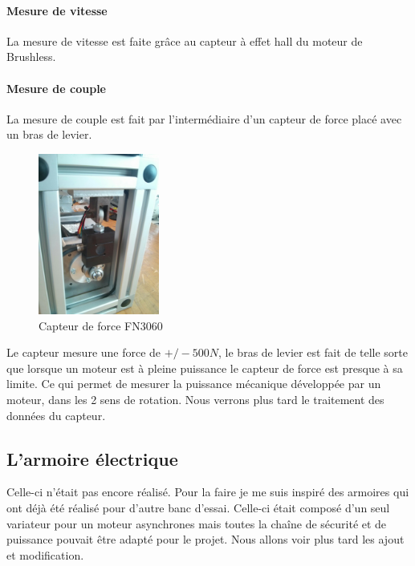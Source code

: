 \documentclass[11pt]{article}
\begin{document}
\paragraph{Mesure de vitesse \\}

La mesure de vitesse est faite grâce au capteur à effet hall du moteur de Brushless.

\paragraph{Mesure de couple \\}
La mesure de couple est fait par l'intermédiaire d'un capteur de force placé avec un bras de levier.\\

\begin{figure}[!h]
    \centering
    \includegraphics[width=150px]{IMG_20160628_183033.jpg}
    \caption{Capteur de force FN3060}
\end{figure}
\newpage

Le capteur mesure une force de $+/- 500 N$, le bras de levier est fait de telle sorte que lorsque un moteur est à pleine puissance le capteur de force est presque à sa limite. Ce qui permet de mesurer la puissance mécanique développée par un moteur, dans les 2 sens de rotation. Nous verrons plus tard le traitement des données du capteur.

\subsection{L'armoire électrique}

Celle-ci n'était pas encore réalisé. Pour la faire je me suis inspiré des armoires qui ont déjà été réalisé pour d'autre banc d'essai. Celle-ci était composé d'un seul variateur pour un moteur asynchrones mais toutes la chaîne de sécurité et de puissance pouvait être adapté pour le projet. Nous allons voir plus tard les ajout et modification.
\end{document}
